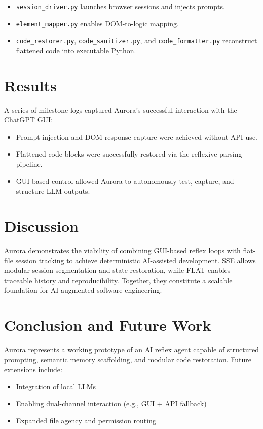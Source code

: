 \documentclass{article}
\begin{document}
\begin{itemize}
  \item \texttt{session\_driver.py} launches browser sessions and injects prompts.
  \item \texttt{element\_mapper.py} enables DOM-to-logic mapping.
  \item \texttt{code\_restorer.py}, \texttt{code\_sanitizer.py}, and \texttt{code\_formatter.py} reconstruct flattened code into executable Python.
\end{itemize}

\section{Results}
A series of milestone logs captured Aurora’s successful interaction with the ChatGPT GUI:

\begin{itemize}
  \item Prompt injection and DOM response capture were achieved without API use.
  \item Flattened code blocks were successfully restored via the reflexive parsing pipeline.
  \item GUI-based control allowed Aurora to autonomously test, capture, and structure LLM outputs.
\end{itemize}

\section{Discussion}
Aurora demonstrates the viability of combining GUI-based reflex loops with flat-file session tracking to achieve deterministic AI-assisted development. SSE allows modular session segmentation and state restoration, while FLAT enables traceable history and reproducibility. Together, they constitute a scalable foundation for AI-augmented software engineering.

\section{Conclusion and Future Work}
Aurora represents a working prototype of an AI reflex agent capable of structured prompting, semantic memory scaffolding, and modular code restoration. Future extensions include:

\begin{itemize}
  \item Integration of local LLMs
  \item Enabling dual-channel interaction (e.g., GUI + API fallback)
  \item Expanded file agency and permission routing
\end{itemize}
\end{document}
